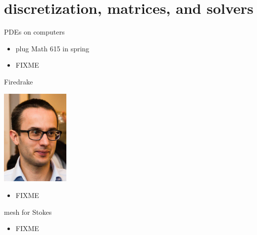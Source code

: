 \documentclass[10pt,hyperref,dvipsnames]{beamer}
\begin{document}
\section{discretization, matrices, and solvers}

\begin{frame}{PDEs on computers}

\begin{itemize}
\item plug Math 615 in spring
\item FIXME
\end{itemize}
\end{frame}


\begin{frame}{Firedrake}

\hfill \includegraphics[width=0.25\textwidth]{figs/people/lmitchell.jpg}

\vspace{-20mm}
\begin{itemize}
\item FIXME
\end{itemize}
\end{frame}


\begin{frame}{mesh for Stokes}

\begin{itemize}
\item FIXME
\begin{center}

\end{center}
\end{itemize}
\end{frame}
\end{document}
